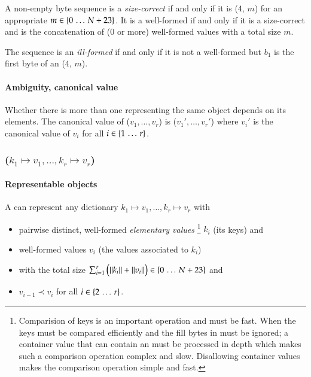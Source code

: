 A non-empty byte sequence  is a \emph{size-correct} \DborSequenceValue{}
if and only if it is
\DborIntegerToken*($4$, $m$) {\Concat}  for an appropriate
$m \in \{0 \,\ldots\, N + 23\}$.
It is a well-formed \DborSequenceValue{} if and only if it is a size-correct \DborSequenceValue{} and
 is the concatenation of ($0$ or more)
well-formed values with a total size $m$.

The sequence is an \emph{ill-formed} \DborSequenceValue{} if and only if it is not a well-formed
\DborSequenceValue{} but $b_1$ is the first byte of an \DborIntegerToken*($4$, $m$).

\paragraph{Ambiguity, canonical value}

Whether there is more than one \DborSequenceValue{} representing the same object depends on its
elements.
The canonical value of \DborSequenceValue{}($v_1, \ldots, v_r$) is
\DborSequenceValue($v_1', \ldots, v_r'$)
where $v_i'$ is the canonical value of $v_i$ for all $i \in \{1 \,\ldots\, r\}$.


\subsubsection{\DborDictionaryValue($k_1 \mapsto v_1, \ldots, k_r \mapsto v_r$)}
\hypertarget{sec:def:DictionaryValue}{}

\paragraph{Representable objects}

A \DborDictionaryValue{} can represent any dictionary $k_1 \mapsto v_1, \ldots, k_r \mapsto v_r$ with
\begin{itemize}
    \item
    pairwise distinct, well-formed \emph{elementary values}%
    \footnote{
        Comparision of keys is an important operation and must be fast.
        When the keys must be compared efficiently and the fill bytes in \DborAllocatedValue*{} must be
        ignored; a container value that can contain an \DborAllocatedValue*{} must be processed in depth
        which makes such a comparison operation complex and slow.
        Disallowing container values makes the comparison operation simple and fast.
    }
    $k_i$ (its keys) and

    \item
    well-formed values $v_i$ (the values associated to $k_i$)

    \item
    with the total size $\sum_{i = 1}^r \big(\|k_i\| + \|v_i\|\big) \in \{0 \,\ldots\, N + 23\}$ and

    \item
    $v_{i - 1} \prec v_{i}$ for all $i \in \{2 \,\ldots\, r\}$.
\end{itemize}

